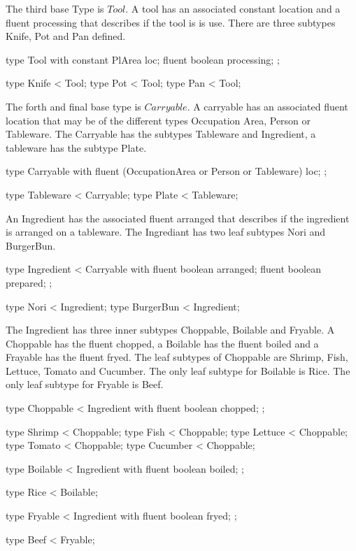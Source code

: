The third base Type is $Tool$. A tool has an associated constant location and a fluent processing that describes if the tool is is use.
There are three subtypes Knife, Pot and Pan defined.

\begin{anmlcode}
type Tool with {
  constant PlArea loc;
  fluent boolean processing;
};

type Knife < Tool;
type Pot < Tool;
type Pan < Tool;
\end{anmlcode}

The forth and final base type is $Carryable$.
A carryable has an associated fluent location that may be of the different types Occupation Area, Person or Tableware.
The Carryable has the subtypes Tableware and Ingredient, a tableware has the subtype Plate.

\begin{anmlcode}
type Carryable with {
  fluent (OccupationArea or Person or Tableware) loc;
};

type Tableware < Carryable;
type Plate < Tableware;
\end{anmlcode}

An Ingredient has the associated fluent arranged that describes if the ingredient is arranged on a tableware.
The Ingrediant has two leaf subtypes Nori and BurgerBun.

\begin{anmlcode}
type Ingredient < Carryable with {
  fluent boolean arranged;
  fluent boolean prepared;
};

type Nori < Ingredient;
type BurgerBun < Ingredient;
\end{anmlcode}

The Ingredient has three inner subtypes Choppable, Boilable and Fryable.
A Choppable has the fluent chopped, a Boilable has the fluent boiled and a Frayable has the fluent fryed.
The leaf subtypes of Choppable are Shrimp, Fish, Lettuce, Tomato and Cucumber.
The only leaf subtype for Boilable is Rice.
The only leaf subtype for Fryable is Beef.

\begin{anmlcode}
type Choppable < Ingredient with {
  fluent boolean chopped;
};

type Shrimp < Choppable;
type Fish < Choppable;
type Lettuce < Choppable;
type Tomato < Choppable;
type Cucumber < Choppable;

type Boilable < Ingredient with {
  fluent boolean boiled;
};

type Rice < Boilable;


type Fryable < Ingredient with {
  fluent boolean fryed;
};

type Beef < Fryable;
\end{anmlcode}

